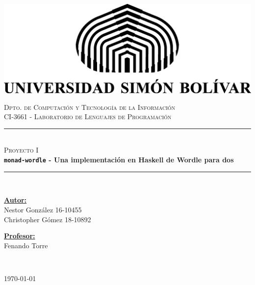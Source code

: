 \documentclass[11pt]{article}
\begin{document}

\begin{center} 
   \newcommand{\HRule}{\rule{\linewidth}{0.5mm}}  

   \begin{minipage}{0.48\textwidth}
      \begin{center}
         \includegraphics[scale = 0.8]{logotip.png}
      \end{center}
   \end{minipage}

   \vspace*{0.2cm}
   \textsc{\large Dpto. de Computación y Tecnología de la Información} \\ 
   \textsc{\large CI-3661 - Laboratorio de Lenguajes de Programación} \\ [4cm] 

   \vspace*{1cm}
   \HRule \\ [0.4cm]
   \textsc{\Large Proyecto I } \\ [0.4cm]
   {\Huge \bfseries \texttt{monad-wordle} - Una implementación en Haskell de Wordle para dos} \\ [0.4cm] 
   \HRule \\ [6cm]

   \begin{minipage}{\textwidth} 
      \begin{flushleft} \large    
         \textbf{\underline{Autor:}} \\ 
         Nestor González 16-10455 \\
         Christopher Gómez 18-10892 \\
      \end{flushleft}
   \end{minipage}

   \begin{minipage}{\textwidth}
      \vspace{-2cm}
      \begin{flushright} \large
         \textbf{\underline{Profesor:}} \\
         Fenando Torre 
      \end{flushright}
   \end{minipage} \\ [2cm]

   \begin{center}
      {\large \today}
   \end{center}
\end{center}
\end{document}
